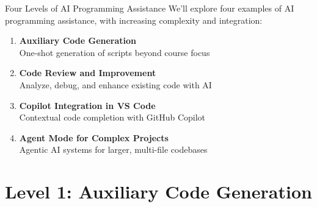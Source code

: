\documentclass[xcolor=dvipsnames, aspectratio=169]{beamer}
\begin{document}
\begin{frame}{Four Levels of AI Programming Assistance}
  We'll explore four examples of AI programming assistance, with increasing complexity and integration:
  
  \begin{enumerate}
    \item \textbf{Auxiliary Code Generation}\\
    One-shot generation of scripts beyond course focus
    
    \item \textbf{Code Review and Improvement}\\
    Analyze, debug, and enhance existing code with AI
    
    \item \textbf{Copilot Integration in VS Code}\\
    Contextual code completion with GitHub Copilot
    
    \item \textbf{Agent Mode for Complex Projects}\\
    Agentic AI systems for larger, multi-file codebases
  \end{enumerate}
\end{frame}

\section{Level 1: Auxiliary Code Generation}
\end{document}
